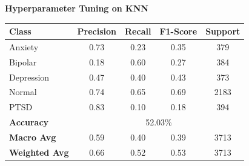 \begin{center}
    \textbf{Hyperparameter Tuning on KNN} \\[0.5em]
    \begin{tabular}{|l|c|c|c|c|}
        \hline
        \textbf{Class} & \textbf{Precision} & \textbf{Recall} & \textbf{F1-Score} & \textbf{Support} \\ \hline
        Anxiety        & 0.73               & 0.23            & 0.35              & 379             \\ \hline
        Bipolar        & 0.18               & 0.60            & 0.27              & 384             \\ \hline
        Depression     & 0.47               & 0.40            & 0.43              & 373             \\ \hline
        Normal         & 0.74               & 0.65            & 0.69              & 2183            \\ \hline
        PTSD           & 0.83               & 0.10            & 0.18              & 394             \\ \hline
        \textbf{Accuracy} & \multicolumn{4}{|c|}{52.03\%} \\ \hline
        \textbf{Macro Avg} & 0.59            & 0.40            & 0.39              & 3713            \\ \hline
        \textbf{Weighted Avg} & 0.66         & 0.52            & 0.53              & 3713            \\ \hline
    \end{tabular}
\end{center}



